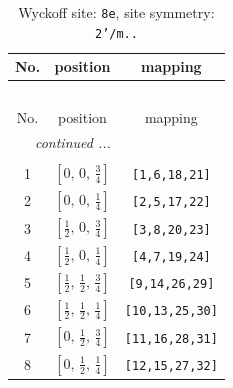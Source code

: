 \documentclass[fleqn,8pt]{jsarticle}
\begin{document}
\begin{longtable}{ccc}
\caption{Wyckoff site: {\tt 8e}, site symmetry: {\tt 2'/m..}}
 \\
 \hline \hline
No. & position & mapping \\ \hline \endfirsthead

\multicolumn{2}{l}{\tablename\ \thetable{}} \\
 \hline \hline
No. & position & mapping \\ \hline \endhead

 \hline \hline
\multicolumn{2}{r}{\footnotesize\it continued ...} \\ \endfoot

 \hline \hline
\multicolumn{2}{r}{} \\ \endlastfoot

1 & $\left[ 0,\, 0,\, \frac{3}{4} \right]$ & {\tt [1,6,18,21]} \\ \hline
2 & $\left[ 0,\, 0,\, \frac{1}{4} \right]$ & {\tt [2,5,17,22]} \\ \hline
3 & $\left[ \frac{1}{2},\, 0,\, \frac{3}{4} \right]$ & {\tt [3,8,20,23]} \\ \hline
4 & $\left[ \frac{1}{2},\, 0,\, \frac{1}{4} \right]$ & {\tt [4,7,19,24]} \\ \hline
5 & $\left[ \frac{1}{2},\, \frac{1}{2},\, \frac{3}{4} \right]$ & {\tt [9,14,26,29]} \\ \hline
6 & $\left[ \frac{1}{2},\, \frac{1}{2},\, \frac{1}{4} \right]$ & {\tt [10,13,25,30]} \\ \hline
7 & $\left[ 0,\, \frac{1}{2},\, \frac{3}{4} \right]$ & {\tt [11,16,28,31]} \\ \hline
8 & $\left[ 0,\, \frac{1}{2},\, \frac{1}{4} \right]$ & {\tt [12,15,27,32]} \\
\end{longtable}
\renewcommand{\arraystretch}{1.2}
\end{document}
